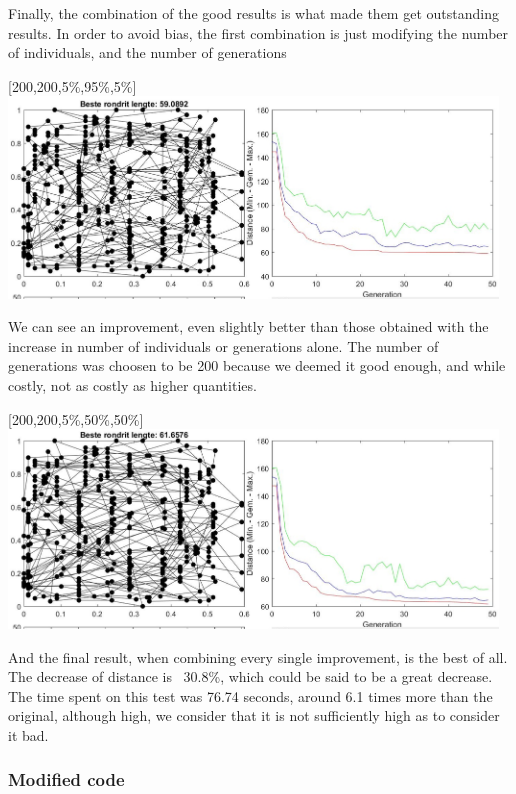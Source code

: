 Finally, the combination of the good results is what made them get
outstanding results. In order to avoid bias, the first combination is just
modifying the number of individuals, and the number of generations\\
\newpage
\begin{center}
[200,200,5\%,95\%,5\%] \\
\includegraphics[width=13cm]{img/specific/xalt_edges/general_6.jpg}
\end{center}
We can see an improvement, even slightly better than those obtained with the
increase in number of individuals or generations alone. The number of
generations was choosen to be 200 because we deemed it good enough, and while
costly, not as costly as higher quantities.
\begin{center}
[200,200,5\%,50\%,50\%] \\
\includegraphics[width=13cm]{img/specific/xalt_edges/general_7.jpg}
\end{center}
And the final result, when combining every single improvement, is the best of
all. The decrease of distance is ~30.8\%, which could be said to be a great
decrease. The time spent on this test was 76.74 seconds, around 6.1 times
more than the original, although high, we consider that it is not
sufficiently high as to consider it bad. \\

\subsubsection{Modified code}

